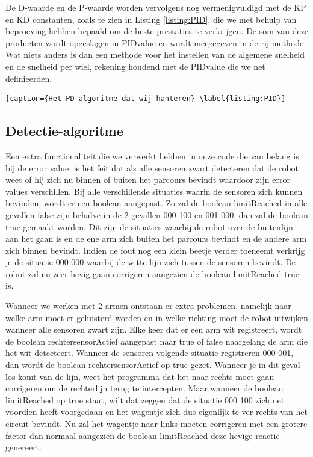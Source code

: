 De D-waarde en de P-waarde worden vervolgens nog vermenigvuldigd met de KP en KD constanten, zoals te zien in Listing \ref{listing:PID},  die we met behulp van beproeving hebben bepaald om de beste prestaties te verkrijgen. De som van deze producten wordt opgeslagen in PIDvalue en wordt meegegeven in de rij-methode. Wat niets anders is dan een methode voor het instellen van de algemene snelheid en de snelheid per wiel, rekening houdend met de PIDvalue die we net definieerden. 


\begin{lstlisting}[caption={Het PD-algoritme dat wij hanteren} \label{listing:PID}]
\end{lstlisting}


\subsection{Detectie-algoritme}

Een extra functionaliteit die we verwerkt hebben in onze code die van belang is bij de error value, is het feit dat als alle sensoren zwart detecteren dat de robot weet of hij zich nu binnen of buiten het parcours bevindt waardoor zijn error values verschillen. Bij alle verschillende situaties waarin de sensoren zich kunnen bevinden, wordt er een boolean aangepast. Zo zal de boolean limitReached in alle gevallen false zijn behalve in de 2 gevallen 000 100 en 001 000, dan zal de boolean true gemaakt worden. Dit zijn de situaties waarbij de robot over de buitenlijn aan het gaan is en de ene arm zich buiten het parcours bevindt en de andere arm zich binnen bevindt. Indien de fout nog een klein beetje verder toeneemt verkrijg je de situatie 000 000 waarbij de witte lijn zich tussen de sensoren bevindt. De robot zal nu zeer hevig gaan corrigeren aangezien de boolean limitReached true is. 

Wanneer we werken met 2 armen ontstaan er extra problemen, namelijk naar welke arm moet er geluisterd worden en in welke richting moet de robot uitwijken wanneer alle sensoren zwart zijn. Elke keer dat er een arm wit registreert, wordt de boolean rechtersensorActief aangepast naar true of false naargelang de arm die het wit detecteert. Wanneer de sensoren volgende situatie registreren 000 001, dan wordt de boolean rechtersensorActief op true gezet. Wanneer je in dit geval los komt van de lijn, weet het programma dat het naar rechts moet gaan corrigeren om de rechterlijn terug te intercepten. Maar wanneer de boolean limitReached op true staat, wilt dat zeggen dat de situatie 000 100 zich net voordien heeft voorgedaan en het wagentje zich dus eigenlijk te ver rechts van het circuit bevindt. Nu zal het wagentje naar links moeten corrigeren met een grotere factor dan normaal aangezien de boolean limitReached deze hevige reactie genereert.


